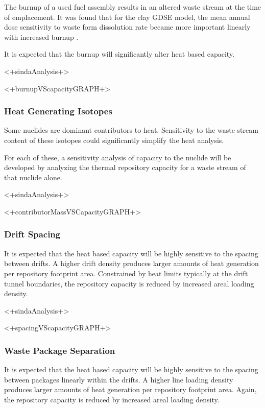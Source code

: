 The burnup of a used fuel assembly results in an altered waste stream at the 
time of emplacement. It was found that for the clay \gls{GDSE} model, the mean 
annual dose sensitivity to waste form dissolution rate became more important 
linearly with increased burnup \cite{nutt_generic_2011}.

It is expected that the burnup will significantly alter heat based capacity. 

<+sindaAnalysis+>

<+burnupVScapacityGRAPH+>

\subsubsection{Heat Generating Isotopes}

Some nuclides are dominant contributors to heat. Sensitivity to the waste stream 
content of these isotopes could significantly simplify the heat analysis. 
 
For each of these, a sensitivity analysis of capacity to the nuclide will be 
developed by analyzing the thermal repository capacity for a waste stream of 
that nuclide alone.  

<+sindaAnalysis+>

<+contributorMassVSCapacityGRAPH+>

\subsubsection{Drift Spacing}

It is expected that the heat based capacity will be highly sensitive to the 
spacing between drifts. A higher drift density produces larger amounts of heat 
generation per repository footprint area. Constrained by heat limits typically 
at the drift tunnel boundaries, the repository capacity is reduced by increased 
areal loading density. 

<+sindaAnalysis+>

<+spacingVScapacityGRAPH+>

\subsubsection{Waste Package Separation}

It is expected that the heat based capacity will be highly sensitive to the 
spacing between packages linearly within the drifts. A higher line loading 
density produces larger amounts of heat generation per repository footprint 
area.  Again, the repository capacity is reduced by increased areal loading 
density. 

